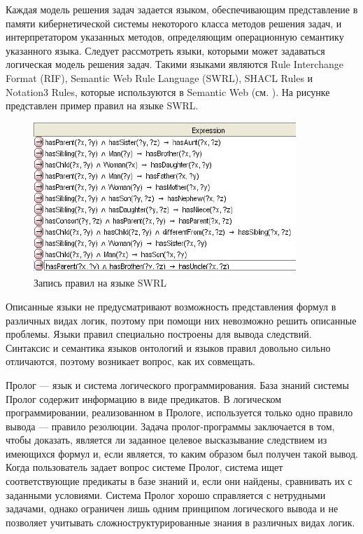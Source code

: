 Каждая модель решения задач задается языком, обеспечивающим представление в памяти кибернетической системы некоторого класса методов решения задач, и интерпретатором указанных методов, определяющим операционную семантику указанного языка. Следует рассмотреть языки, которыми может задаваться логическая модель решения задач. Такими языками являются Rule Interchange Format (RIF), Semantic Web Rule Language (SWRL), SHACL Rules и Notation3 Rules, которые используются в Semantic Web (см. ). На рисунке  представлен пример правил на языке SWRL.

\begin{figure}[http]
	\includegraphics[scale=0.8]{author/part3/figures/swrl_example.png}
	\caption{Запись правил на языке SWRL}
	\label{fig:swrl_example}
\end{figure}

Описанные языки не предусматривают возможность представления формул в различных видах логик, поэтому при помощи них невозможно решить описанные проблемы. Языки правил специально построены для вывода следствий. Синтаксис и семантика языков онтологий и языков правил довольно сильно отличаются, поэтому возникает вопрос, как их совмещать. 

Пролог --- язык и система логического программирования. База знаний системы Пролог содержит информацию в виде предикатов. В логическом программировании, реализованном в Прологе, используется только одно правило вывода --- правило резолюции. Задача пролог-программы заключается в том, чтобы доказать, является ли заданное целевое высказывание следствием из имеющихся формул и, если является, то каким образом был получен такой вывод. Когда пользователь задает вопрос системе Пролог, система ищет соответствующие предикаты в базе знаний и, если они найдены, сравнивать их с заданными условиями. Система Пролог хорошо справляется с нетрудными задачами, однако ограничен лишь одним принципом логического вывода и не позволяет учитывать сложноструктурированные знания в различных видах логик.

